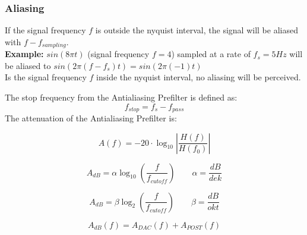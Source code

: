 \subsubsection{Aliasing}
If the signal frequency $f$ is outside the nyquist interval, the signal will be
aliased with $f - f_{sampling}$.\\
\textbf{Example:} $sin(8\pi t)$ (signal frequency $f=4$) sampled at a rate of
$f_s=5Hz$ will be aliased to $sin(2\pi (f-f_s) t) = sin(2\pi (-1) t)$\\

Is the signal frequency $f$ inside the nyquist interval, no aliasing will be
perceived.

The stop frequency from the Antialiasing Prefilter is defined as:
\[ f_{stop} = f_s - f_{pass} \]
The attenuation of the Antialiasing Prefilter is:

\[ A(f) = -20 \cdot \log_{10}{\left|\frac{H(f)}{H(f_0)}\right|} \]

\[ A_{dB} = \alpha \log_{10}(\frac{f}{f_{cutoff}}) \qquad \alpha = \frac{dB}{dek} \]

\[ A_{dB} = \beta \log_{2}(\frac{f}{f_{cutoff}}) \qquad \beta = \frac{dB}{okt} \]

\[ A_{dB}(f) = A_{DAC}(f) + A_{POST}(f) \]
